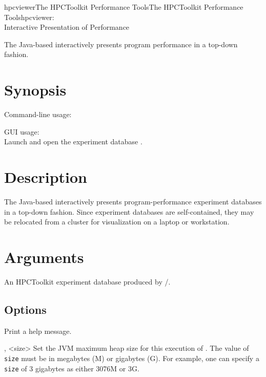 \documentclass[english]{article}
\begin{document}
\begin{Name}{1}{hpcviewer}{The HPCToolkit Performance Tools}{The HPCToolkit Performance Tools}{hpcviewer:\\ Interactive Presentation of Performance}

The Java-based  interactively presents program performance in a top-down fashion.

\end{Name}

\section{Synopsis}

Command-line usage:\\
\SP\SP\SP{}  

GUI usage:\\
\SP\SP\SP Launch  and open the experiment database .


\section{Description}

The Java-based  interactively presents program-performance experiment databases
in a top-down fashion.
Since experiment databases are self-contained,
they may be relocated from a cluster for visualization on a laptop or workstation.

\section{Arguments}

\begin{Description}
\item[\Arg{hpctoolkit-database}] An HPCToolkit experiment database
produced by /.
\end{Description}


\subsection{Options}

\begin{Description}

\item[\Opt{-h} \Opt{--help}]
Print a help message.


\item[\Opt{-jh}, \Opt{--java-heap} <size>]
  	Set the JVM maximum heap size for this execution of  . The value of \texttt{size} must be
	in megabytes (M) or gigabytes (G). For example, one can specify a \texttt{size}  of 3 gigabytes as either
	3076M or 3G.


\end{Description}
\end{document}
